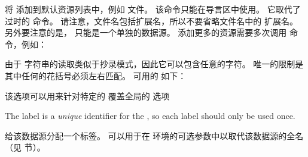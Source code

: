 \begin{ltxsyntax}
将  添加到默认资源列表中，例如  文件。
该命令只能在导言区中使用。
它取代了过时的  命令。
请注意，文件名包括扩展名，所以不要省略文件名中的  扩展名。
另外要注意的是， 只能是一个单独的数据源。
添加更多的资源需要多次调用  命令，例如：
\begin{ltxexample}




.bib}


\end{ltxexample}
%
由于  字符串的读取类似于抄录模式，因此它可以包含任意的字符。
唯一的限制是其中任何的花括号必须左右匹配。
可用的  如下：

\begin{optionlist*}



该选项可以用来针对特定的  覆盖全局的 选项



The label is a \emph{unique} identifier for the , so each label should only be used once.

给该数据源分配一个标签。
 可以用于在  环境的可选参数中以取代该数据源的全名
（见  节）。




\end{optionlist*}
\end{ltxsyntax}
